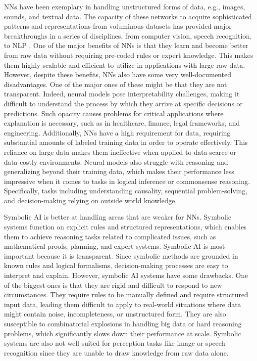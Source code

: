 \documentclass[12pt]{article}
\begin{document}
\noindent NNs have been exemplary in handling unstructured forms of data, e.g., images, sounds, and textual data. The capacity of these networks to acquire sophisticated patterns and representations from voluminous datasets has provided major breakthroughs in a series of disciplines, from computer vision, speech recognition, to NLP \cite{kenton2019bert,vaswani2017attention}. One of the major benefits of NNs is that they learn and become better from raw data without requiring pre-coded rules or expert knowledge. This makes them highly scalable and efficient to utilize in applications with large raw data. However, despite these benefits, NNs also have some very well-documented disadvantages. One of the major ones of these might be that they are not transparent. Indeed, neural models pose interpretability challenges, making it difficult to understand the process by which they arrive at specific decisions or predictions. Such opacity causes problems for critical applications where explanation is necessary, such as in healthcare, finance, legal frameworks, and engineering. Additionally, NNs have a high requirement for data, requiring substantial amounts of labeled training data in order to operate effectively. This reliance on large data makes them ineffective when applied to data-scarce or data-costly environments. Neural models also struggle with reasoning and generalizing beyond their training data, which makes their performance less impressive when it comes to tasks in logical inference or commonsense reasoning. Specifically, tasks including understanding causality, sequential problem-solving, and decision-making relying on outside world knowledge.

\vspace*{0.5cm}

Symbolic AI is better at handling areas that are weaker for NNs. Symbolic systems function on explicit rules and structured representations, which enables them to achieve reasoning tasks related to complicated issues, such as mathematical proofs, planning, and expert systems. Symbolic AI is most important because it is transparent. Since symbolic methods are grounded in known rules and logical formalisms, decision-making processes are easy to interpret and explain. However, symbolic AI systems have some drawbacks. One of the biggest ones is that they are rigid and difficult to respond to new circumstances. They require rules to be manually defined and require structured input data, leading them difficult to apply to real-world situations where data might contain noise, incompleteness, or unstructured form. They are also susceptible to combinatorial explosions in handling big data or hard reasoning problems, which significantly slows down their performance at scale. Symbolic systems are also not well suited for perception tasks like image or speech recognition since they are unable to draw knowledge from raw data alone.
\end{document}
